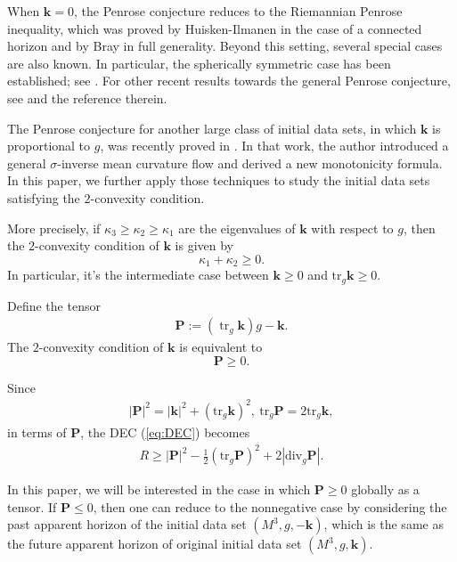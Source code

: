 \documentclass[11pt,letterpaper]{amsart}
\theoremstyle{definition}
\theoremstyle{remark}
\newcommand{\tr}{\operatorname{tr}}
\newcommand{\Pten}{\mathbf P}
\newcommand{\kten}{\mathbf k}
\begin{document}
When $\mathbf{k}=0$, the Penrose conjecture reduces to the Riemannian Penrose inequality, which was proved by Huisken-Ilmanen \cite{HI01} in the case of a connected horizon and by Bray \cite{Bray01} in full generality. Beyond this setting, several special cases are also known. In particular, the spherically symmetric case has been established; see \cite{Hayward96, IMM96, BrayKhuri10Jang}. For other  recent results towards the general Penrose conjecture, see \cite{AllenBrydenKazarasKhuriPenrose, AnHeKerrPenrose, EllithyPenrose} and the reference therein. 

The Penrose conjecture for another large class of initial data sets, in which $\kten$ is proportional to $g$, was recently proved in \cite{Dong26SigmaIMCF}. In that work, the author introduced a general $\sigma $-inverse mean curvature flow and derived a new monotonicity formula. In this paper, we further apply those techniques to study the initial data sets satisfying the $2$-convexity condition.

More precisely, if $\kappa_3 \geq  \kappa_2 \geq \kappa_1$ are the eigenvalues of $\kten$ with respect to $g$, then the $2$-convexity condition of $\kten$ is given by
$$\kappa_1 + \kappa_2 \geq 0.$$
In particular, it's the intermediate case between $\kten \geq 0$ and $\mathrm{tr}_g \kten \geq 0$.


Define the tensor
\begin{align}\label{eq:def-P}
  \Pten :=(\tr_g\kten)g-\kten.
\end{align}
The $2$-convexity condition of $\kten$ is equivalent to 
$$\Pten \geq 0 .$$

Since
\begin{align*}
	|\Pten|^2 = |\kten|^2 + (\mathrm{tr}_g \kten)^2,\ \mathrm{tr}_g\Pten = 2 \mathrm{tr}_g \kten,
\end{align*} 
in terms of $\Pten$, the DEC (\ref{eq:DEC}) becomes
\begin{align}\label{eq:DEC2}
	R \geq |\Pten|^2 - \frac{1}{2} (\mathrm{tr}_g \Pten)^2 + 2 |\mathrm{div}_g \Pten|.
\end{align}



In this paper, we will be interested in the case in which $\Pten \geq 0$ globally as a tensor. If $\Pten \leq 0$,  then one can reduce to the nonnegative case by considering the past apparent horizon of the initial data set $(M^3, g, - \mathbf{k})$, which is the same as the future apparent horizon of original initial data set $(M^3, g, \kten)$. 
\end{document}
